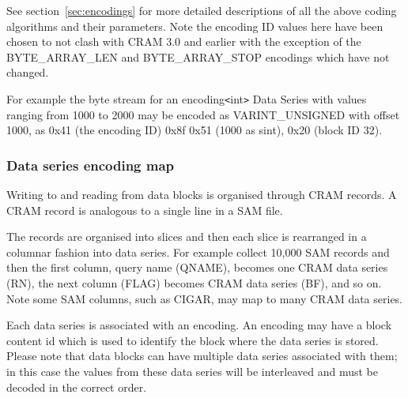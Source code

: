 \documentclass[a4paper]{article}
\begin{document}
See section~\ref{sec:encodings} for more detailed descriptions of all
the above coding algorithms and their parameters.  Note the encoding
ID values here have been chosen to not clash with CRAM 3.0 and earlier
with the exception of the BYTE\_ARRAY\_LEN and BYTE\_ARRAY\_STOP
encodings which have not changed.

For example the byte stream for an encoding\texttt{<}int\texttt{>}
Data Series with values ranging from 1000 to 2000 may be encoded as
VARINT\_UNSIGNED with offset 1000, as 0x41 (the encoding ID) 0x8f 0x51
(1000 as sint), 0x20 (block ID 32).

\subsubsection{Data series encoding map}

Writing to and reading from data blocks is organised through CRAM
records. A CRAM record is analogous to a single line in a SAM file.

The records are organised into slices and then each slice is
rearranged in a columnar fashion into data series.  For example
collect 10,000 SAM records and then the first column, query name
(QNAME), becomes one CRAM data series (RN), the next column (FLAG)
becomes CRAM data series (BF), and so on.  Note some SAM columns, such
as CIGAR, may map to many CRAM data series.

Each data series is associated with an encoding. An encoding may have
a block content id which is used to identify the block where the data
series is stored. Please note that data blocks can have multiple
data series associated with them; in this case the values from these
data series will be interleaved and must be decoded in the correct order.
\end{document}
